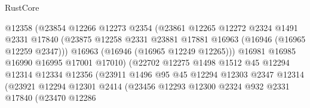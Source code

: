 \begin{lexlean}{RustCore}
\begin{coremodule}
                                  @12358
                                  (@23854
                                    @12266
                                    @12273
                                    @2354
                                    (@23861
                                      @12265
                                      @12272
                                      @2324
                                      @1491
                                      @2331
                                      @17840
                                      (@23875
                                        @12258
                                        @2331
                                        @23881
                                        @17881
                                        @16963
                                        (@16946 (@16965 @12259 @2347)))
                                      @16963
                                      (@16946 (@16965 @12249 @12265)))
                                    @16981
                                    @16985
                                    @16990
                                    @16995
                                    @17001
                                    @17010)
                                  (@22702
                                    @12275
                                    @1498
                                    @1512
                                    @45
                                    @12294
                                    @12314
                                    @12334
                                    @12356
                                    (@23911
                                      @1496
                                      @95
                                      @45
                                      @12294
                                      @12303
                                      @2347
                                      @12314
                                      (@23921
                                        @12294
                                        @12301
                                        @2414
                                        (@23456
                                          @12293
                                          @12300
                                          @2324
                                          @932
                                          @2331
                                          @17840
                                          (@23470
                                            @12286

\end{coremodule}
\end{lexlean}
